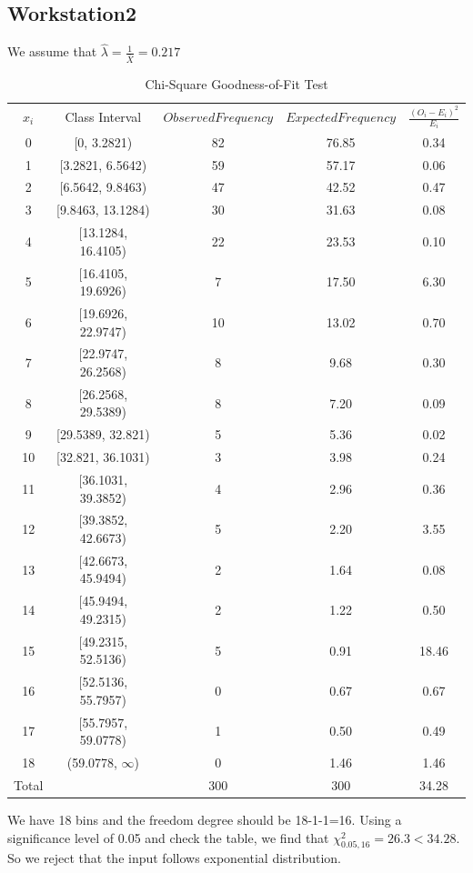 \documentclass{article}
\begin{document}
\subsection{Workstation2}
We assume that $\hat{\lambda}=\frac{1}{\bar{X}}=0.217$
\begin{table}[htp]
\caption{Chi-Square Goodness-of-Fit Test}
\begin{center}
\begin{tabular}{ccccc}
\hline
$x_i$ & Class Interval & $Observed Frequency$ & $Expected Frequency$ & $\frac{(O_i-E_i)^2}{E_i}$\\
0&[0, 3.2821)&82&76.85&0.34\\
1&[3.2821, 6.5642)&59&57.17&0.06\\
2&[6.5642, 9.8463)&47&42.52&0.47\\
3&[9.8463, 13.1284)&30&31.63&0.08\\
4&[13.1284, 16.4105)&22&23.53&0.10\\
5&[16.4105, 19.6926)&7&17.50&6.30\\
6&[19.6926, 22.9747)&10&13.02&0.70\\
7&[22.9747, 26.2568)&8&9.68&0.30\\
8&[26.2568, 29.5389)&8&7.20&0.09\\
9&[29.5389, 32.821)&5&5.36&0.02\\
10&[32.821, 36.1031)&3&3.98&0.24\\
11&[36.1031, 39.3852)&4&2.96&0.36\\
12&[39.3852, 42.6673)&5&2.20&3.55\\
13&[42.6673, 45.9494)&2&1.64&0.08\\
14&[45.9494, 49.2315)&2&1.22&0.50\\
15&[49.2315, 52.5136)&5&0.91&18.46\\
16&[52.5136, 55.7957)&0&0.67&0.67\\
17&[55.7957, 59.0778)&1&0.50&0.49\\
18&(59.0778, $\infty$)&0&1.46&1.46\\
\hline
Total& &300&300&34.28\\

\hline

\end{tabular}
\end{center}
\label{default}
\end{table}%

We have 18 bins and the freedom degree should be 18-1-1=16. Using a significance level of 0.05 and check the table, we find that $\chi^2_{0.05, 16}=26.3 < 34.28$. So we reject that the input follows exponential distribution.
\end{document}
